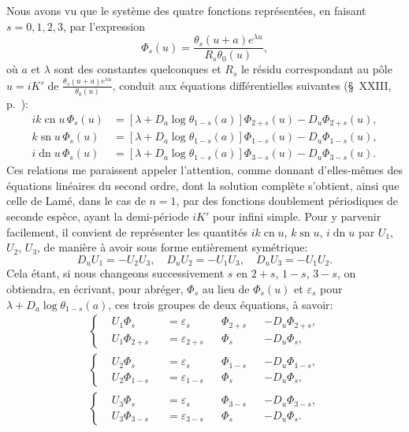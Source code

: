 \documentclass[11pt,leqno,oneside,letterpaper]{book}[2005/09/16]
\DeclareMathOperator{\sn}{sn}
\DeclareMathOperator{\cn}{cn}
\DeclareMathOperator{\dn}{dn}
\begin{document}
Nous avons vu que le syst\`eme des quatre fonctions repr\'esent\'ees, en faisant
$s = 0, 1, 2, 3$, par l'expression
\[
\Phi_s(u) = \frac{\theta_s(u+a)e^{\lambda u}}{R_s\theta_0(u)},
\]
o\`u $a$ et $\lambda$ sont des constantes quelconques et $R_s$ le r\'esidu correspondant
au p\^ole $u = iK'$ de $\frac{\theta_s(u+a)e^{\lambda u}}{\theta_0(u)}$, conduit aux \'equations diff\'erentielles suivantes
(\S~XXIII, p.~\pageref{page62}):
\begin{align*}
ik\cn u\,\Phi_s(u) &= [\lambda+D_a\log\theta_{1-s}(a)]\Phi_{2+s}(u)-D_u\Phi_{2+s}(u),\\
k\sn u\,\Phi_s(u) &= [\lambda+D_a\log\theta_{1-s}(a)]\Phi_{1-s}(u)-D_u\Phi_{1-s}(u),\\
i\dn u\,\Phi_s(u) &= [\lambda+D_a\log\theta_{1-s}(a)]\Phi_{3-s}(u)-D_u\Phi_{3-s}(u).
\end{align*}
Ces relations me paraissent appeler l'attention, comme donnant d'elles-m\^emes
des \'equations lin\'eaires du second ordre, dont la solution compl\`ete
s'obtient, ainsi que celle de Lam\'e, dans le cas de $n = 1$, par des fonctions
doublement p\'eriodiques de seconde esp\`ece, ayant la demi-p\'eriode $iK'$ pour
infini simple. Pour y parvenir facilement, il convient de repr\'esenter les
quantit\'es $ik \cn u$, $k \sn u$, $i \dn u$ par $U_1$, $U_2$, $U_3$, de mani\`ere \`a avoir sous
forme enti\`erement sym\'etrique:
\[
D_u U_1 = -U_2 U_3,\quad
D_u U_2 = -U_1 U_3,\quad
D_u U_3 = -U_1 U_2.
\]
Cela \'etant, si nous changeons successivement $s$ en $2+s$, $1-s$, $3-s$, on
obtiendra, en \'ecrivant, pour abr\'eger, $\Phi_s$ au lieu de $\Phi_s(u)$ et $\varepsilon_s$ pour
$\lambda+ D_a\log\theta_{1-s}(a)$, ces trois groupes de deux \'equations, \`a savoir:
\begin{gather*}
\left\{
\begin{alignedat}{5}
&U_1\Phi_s     &&= \varepsilon_s    &&\Phi_{2+s} && - D_u\Phi_{2+s},\\
&U_1\Phi_{2+s} &&= \varepsilon_{2+s}&&\Phi_s     && - D_u\Phi_s,
\end{alignedat}
\right.\\
\left\{
\begin{alignedat}{5}
&U_2\Phi_s     &&= \varepsilon_s    &&\Phi_{1-s} && - D_u\Phi_{1-s},\\
&U_2\Phi_{1-s} &&= \varepsilon_{1-s}&&\Phi_s     && - D_u\Phi_s,
\end{alignedat}
\right.\\
\left\{
\begin{alignedat}{5}
&U_3\Phi_s     &&= \varepsilon_s    &&\Phi_{3-s} && - D_u\Phi_{3-s},\\
&U_3\Phi_{3-s} &&= \varepsilon_{3-s}&&\Phi_s     && - D_u\Phi_s.
\end{alignedat}
\right.
\end{gather*}
\end{document}
